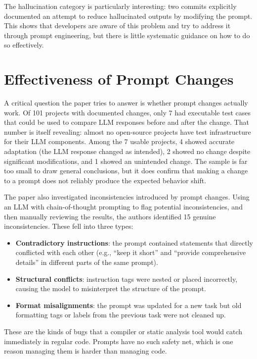 \documentclass[
    pdftex,
    final,
    11pt,
    a4paper,
    parskip=false,
    oneside,
    footheight=0mm,
    footinclude=false,
    toc=bibliography
]{scrbook}
\begin{document}
The hallucination category is particularly interesting: two commits explicitly documented an attempt to reduce hallucinated outputs by modifying the prompt. This shows that developers are aware of this problem and try to address it through prompt engineering, but there is little systematic guidance on how to do so effectively.

\section{Effectiveness of Prompt Changes}

A critical question the paper tries to answer is whether prompt changes actually work. Of 101 projects with documented changes, only 7 had executable test cases that could be used to compare LLM responses before and after the change. That number is itself revealing: almost no open-source projects have test infrastructure for their LLM components. Among the 7 usable projects, 4 showed accurate adaptation (the LLM response changed as intended), 2 showed no change despite significant modifications, and 1 showed an unintended change. The sample is far too small to draw general conclusions, but it does confirm that making a change to a prompt does not reliably produce the expected behavior shift.

The paper also investigated inconsistencies introduced by prompt changes. Using an LLM with chain-of-thought prompting to flag potential inconsistencies, and then manually reviewing the results, the authors identified 15 genuine inconsistencies. These fell into three types:

\begin{itemize}
    \item \textbf{Contradictory instructions}: the prompt contained statements that directly conflicted with each other (e.g., ``keep it short'' and ``provide comprehensive details'' in different parts of the same prompt).
    \item \textbf{Structural conflicts}: instruction tags were nested or placed incorrectly, causing the model to misinterpret the structure of the prompt.
    \item \textbf{Format misalignments}: the prompt was updated for a new task but old formatting tags or labels from the previous task were not cleaned up.
\end{itemize}

These are the kinds of bugs that a compiler or static analysis tool would catch immediately in regular code. Prompts have no such safety net, which is one reason managing them is harder than managing code.
\end{document}
